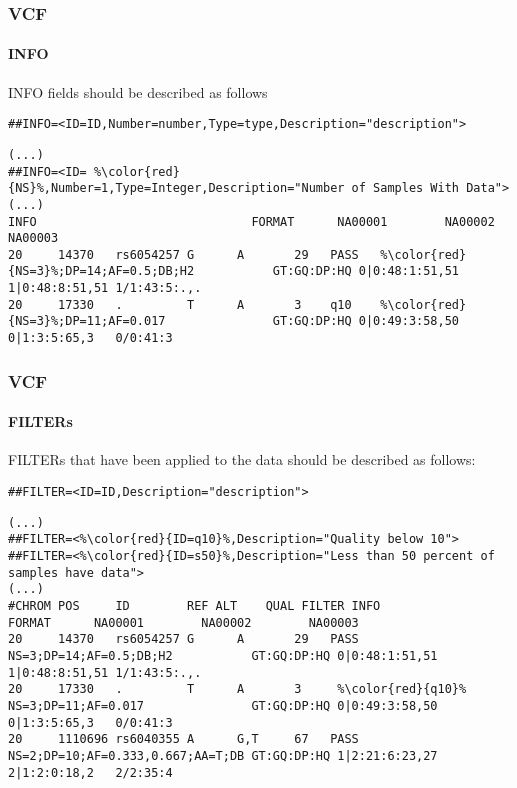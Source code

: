 \documentclass{beamer}
\begin{document}
\begin{frame}[fragile]
\frametitle{VCF}
\framesubtitle{INFO}

INFO fields should be described as follows
\begin{lstlisting}[breaklines=true]
##INFO=<ID=ID,Number=number,Type=type,Description="description">
\end{lstlisting}

\begin{lstlisting}[basicstyle=\tiny,breaklines=false,escapechar=\%]
(...)
##INFO=<ID= %\color{red}{NS}%,Number=1,Type=Integer,Description="Number of Samples With Data">
(...)
INFO                              FORMAT      NA00001        NA00002        NA00003
20     14370   rs6054257 G      A       29   PASS   %\color{red}{NS=3}%;DP=14;AF=0.5;DB;H2           GT:GQ:DP:HQ 0|0:48:1:51,51 1|0:48:8:51,51 1/1:43:5:.,.
20     17330   .         T      A       3    q10    %\color{red}{NS=3}%;DP=11;AF=0.017               GT:GQ:DP:HQ 0|0:49:3:58,50 0|1:3:5:65,3   0/0:41:3
\end{lstlisting}
\end{frame}


\begin{frame}[fragile]
\frametitle{VCF}
\framesubtitle{FILTERs}
FILTERs that have been applied to the data should be described as follows:
\begin{lstlisting}[breaklines=true]
##FILTER=<ID=ID,Description="description">
\end{lstlisting}

\begin{lstlisting}[basicstyle=\tiny,breaklines=false,escapechar=\%]
(...)
##FILTER=<%\color{red}{ID=q10}%,Description="Quality below 10">
##FILTER=<%\color{red}{ID=s50}%,Description="Less than 50 percent of samples have data">
(...)
#CHROM POS     ID        REF ALT    QUAL FILTER INFO                              FORMAT      NA00001        NA00002        NA00003
20     14370   rs6054257 G      A       29   PASS   NS=3;DP=14;AF=0.5;DB;H2           GT:GQ:DP:HQ 0|0:48:1:51,51 1|0:48:8:51,51 1/1:43:5:.,.
20     17330   .         T      A       3     %\color{red}{q10}%    NS=3;DP=11;AF=0.017               GT:GQ:DP:HQ 0|0:49:3:58,50 0|1:3:5:65,3   0/0:41:3
20     1110696 rs6040355 A      G,T     67   PASS   NS=2;DP=10;AF=0.333,0.667;AA=T;DB GT:GQ:DP:HQ 1|2:21:6:23,27 2|1:2:0:18,2   2/2:35:4
\end{lstlisting}
\end{frame}
\end{document}
